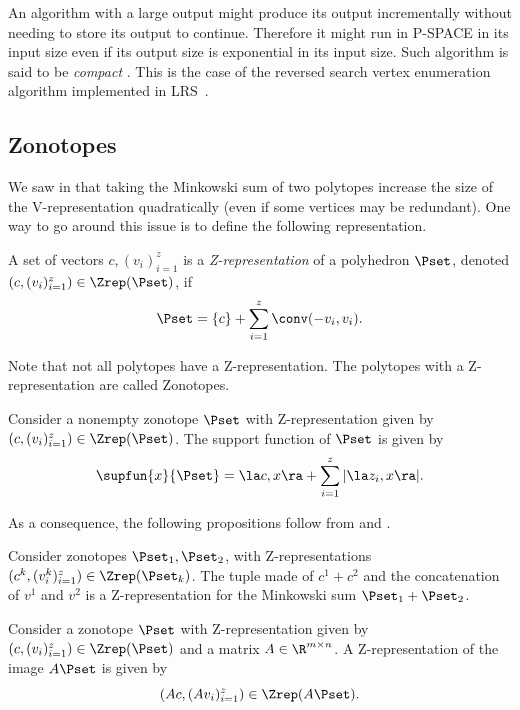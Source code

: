 \documentclass[11pt,twoside,a4paper,openright]{uclouvain-thesis}
\begin{document}
An algorithm with a large output might produce its output incrementally without needing to store its output to continue.
Therefore it might run in P-SPACE in its input size even if its output size is exponential in its input size.
Such algorithm is said to be \emph{compact} \cite{fukuda1996note}.
This is the case of the reversed search vertex enumeration algorithm implemented in LRS~\cite{avis2000revised}.



\subsection{Zonotopes}
\label{sec:zonotope}

We saw in  that taking the Minkowski sum of two polytopes
increase the size of the V-representation quadratically (even if some vertices may be redundant).
One way to go around this issue is to define the following representation.
\begin{mydef}
  A set of vectors $c, (v_i)_{i=1}^z$ is a \emph{Z-representation}
  of a polyhedron $\Pset$,
  denoted $(c, (v_i)_{i=1}^z) \in \Zrep(\Pset)$,
  if
  \[
    \Pset = \{c\} + \sum_{i=1}^z \conv(-v_i, v_i).
  \]
\end{mydef}
Note that not all polytopes have a Z-representation.
The polytopes with a Z-representation are called Zonotopes.

\begin{myprop}
  Consider a nonempty zonotope $\Pset$ with Z-representation given by
  $(c, (v_i)_{i=1}^z) \in \Zrep(\Pset)$.
  The support function of $\Pset$ is given by
  \begin{equation*}
    \supfun{x}{\Pset} =
    \la c, x \ra + \sum_{i=1}^z |\la z_i, x \ra|.
  \end{equation*}
\end{myprop}

As a consequence, the following propositions follow from  and .
\begin{myprop}
  \label{prop:zonosum}
  Consider zonotopes $\Pset_1, \Pset_2$, with Z-representations
  $(c^k, (v_i^k)_{i=1}^z) \in \Zrep(\Pset_k)$.
  The tuple made of $c^1 + c^2$
  and the concatenation of $v^1$ and $v^2$
  is a Z-representation for the Minkowski sum $\Pset_1 + \Pset_2$.
\end{myprop}

\begin{myprop}
  Consider a zonotope $\Pset$ with Z-representation given by
  $(c, (v_i)_{i=1}^z) \in \Zrep(\Pset)$
  and a matrix $A \in \R^{m \times n}$.
  A Z-representation of the image $A\Pset$ is given by
  \begin{equation*}
    (Ac, (Av_i)_{i=1}^z) \in \Zrep(A\Pset).
  \end{equation*}
\end{myprop}
\end{document}
